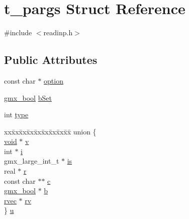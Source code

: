 \hypertarget{structt__pargs}{\section{t\-\_\-pargs \-Struct \-Reference}
\label{structt__pargs}
}


{\ttfamily \#include $<$readinp.\-h$>$}

\subsection*{\-Public \-Attributes}
\begin{DoxyCompactItemize}
\item 
const char $\ast$ \hyperlink{structt__pargs_a12e9039320ed13b2268ce0a872f409d1}{option}
\item 
\hyperlink{include_2types_2simple_8h_a8fddad319f226e856400d190198d5151}{gmx\-\_\-bool} \hyperlink{structt__pargs_af4b4468c6fecd8fe77f3551c12436fa8}{b\-Set}
\item 
int \hyperlink{structt__pargs_a995a1686f7d75fb9aaadc4090a0bfa22}{type}
\item 
\begin{tabbing}
xx\=xx\=xx\=xx\=xx\=xx\=xx\=xx\=xx\=\kill
union \{\\
\>\hyperlink{nbnxn__kernel__simd__4xn__outer_8h_a8dc3f4a797ed992dff49d2fa3477eee8}{void} $\ast$ \hyperlink{structt__pargs_a68200b0ce2221813bb0a0b5b66340f0b}{v}\\
\>int $\ast$ \hyperlink{structt__pargs_aa7de62f02164554c161898ab7b15ec1d}{i}\\
\>gmx\_large\_int\_t $\ast$ \hyperlink{structt__pargs_af2c1c09707cc18ae66fa7d44a029eb59}{is}\\
\>real $\ast$ \hyperlink{structt__pargs_a90a5c0ca62506725a9e95ec84b5efc6e}{r}\\
\>const char $\ast$$\ast$ \hyperlink{structt__pargs_a3fa536862b27057739745502ea637baf}{c}\\
\>\hyperlink{include_2types_2simple_8h_a8fddad319f226e856400d190198d5151}{gmx\_bool} $\ast$ \hyperlink{structt__pargs_ab0d310567577d9fda0379251855d34e1}{b}\\
\>\hyperlink{share_2template_2gromacs_2types_2simple_8h_aa02a552a4abd2f180c282a083dc3a999}{rvec} $\ast$ \hyperlink{structt__pargs_a50001cc92be0dbd2f271e3764affefc2}{rv}\\
\} \hyperlink{structt__pargs_a04e1add8b9e4b3d200e4a941f8775d34}{u}\\


\end{tabbing}
\end{DoxyCompactItemize}
